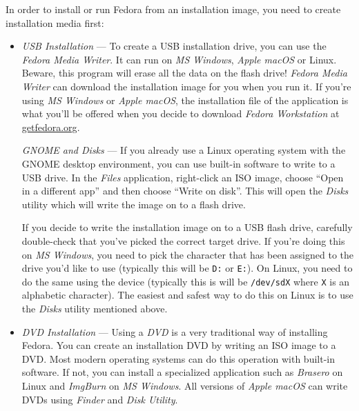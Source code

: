 In order to install or run Fedora from an installation image, you need to create installation media first:
\begin{itemize}
\item\emph{USB Installation} --- To create a USB installation drive, you can use the \emph{Fedora Media Writer}. It can run on \emph{MS Windows}, \emph{Apple macOS} or Linux. Beware, this program will erase all the data on the flash drive! \emph{Fedora Media Writer} can download the installation image for you when you run it. If you're using \emph{MS Windows} or \emph{Apple macOS}, the installation file of the application is what you'll be offered when you decide to download \emph{Fedora Workstation} at \url{getfedora.org}.

\emph{GNOME and Disks} --- If you already use a Linux operating system with the GNOME desktop environment, you can use built-in software to write to a USB drive. In the \emph{Files} application, right-click an ISO image, choose \enquote{Open in a different app} and then choose \enquote{Write on disk}. This will open the \emph{Disks} utility which will write the image on to a flash drive.

If you decide to write the installation image on to a USB flash drive, carefully double-check that you've picked the correct target drive. If you're doing this on \emph{MS Windows}, you need to pick the character that has been assigned to the drive you'd like to use (typically this will be \texttt{D:} or \texttt{E:}). On Linux, you need to do the same using the device (typically this is will be \texttt{/dev/sdX} where \texttt{X} is an alphabetic character). The easiest and safest way to do this on Linux is to use the \emph{Disks} utility mentioned above.

\item\emph{DVD Installation} --- Using a \emph{DVD} is a very traditional way of installing Fedora. You can create an installation DVD by writing an ISO image to a DVD. Most modern operating systems can do this operation with built-in software. If not, you can install a specialized application such as \emph{Brasero} on Linux and \emph{ImgBurn} on \emph{MS Windows}. All versions of \emph{Apple macOS} can write DVDs using \emph{Finder} and \emph{Disk Utility}.
\end{itemize}

